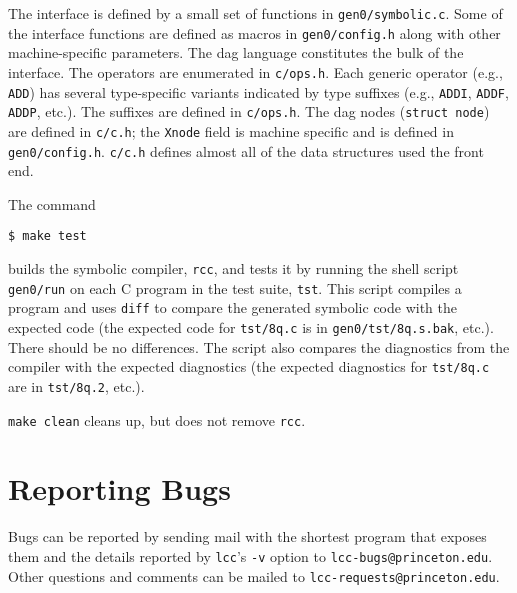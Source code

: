 The interface is defined by a small set of functions in
\verb|gen0/symbolic.c|. Some of the interface functions are defined as
macros in \verb|gen0/config.h| along with other machine-specific parameters.
The dag language constitutes the bulk of the interface. The
operators are enumerated in \verb|c/ops.h|. Each generic operator (e.g.,
\verb|ADD|) has several type-specific variants indicated by type suffixes
(e.g., \verb|ADDI|, \verb|ADDF|, \verb|ADDP|, etc.). The suffixes are defined in
\verb|c/ops.h|.  The dag nodes (\verb|struct node|) are defined in \verb|c/c.h|; the
\verb|Xnode| field is machine specific and is defined in \verb|gen0/config.h|.
\verb|c/c.h| defines almost all of the data structures used the front end.

The command
\begin{verbatim}
$ make test
\end{verbatim}
builds the symbolic compiler, \verb|rcc|, and tests it by running the shell script
\verb|gen0/run| on each C program in the test suite, \verb|tst|.
This script compiles a program and uses \verb|diff| to compare the generated symbolic code
with the expected code (the expected code for \verb|tst/8q.c| is
in \verb|gen0/tst/8q.s.bak|, etc.). There should be no differences.
The script also compares the
diagnostics from the compiler with the expected diagnostics
(the expected diagnostics for \verb|tst/8q.c| are
in \verb|tst/8q.2|, etc.).

\verb|make clean| cleans up, but does not remove \verb|rcc|.


\section{Reporting Bugs}

Bugs can be reported by sending mail with the shortest program
that exposes them and the details reported by \verb|lcc|'s \verb|-v|
option to \verb|lcc-bugs@princeton.edu|.
Other questions and comments can be mailed to \verb|lcc-requests@princeton.edu|.


